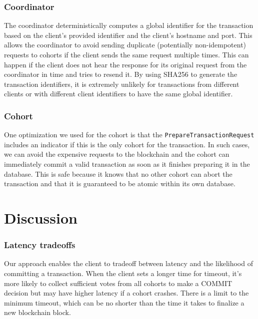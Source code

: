 \documentclass[11pt,conference]{IEEEtran}
\begin{document}
\subsubsection{Coordinator}
The coordinator deterministically computes a global identifier for the transaction based on the client’s provided identifier and the client’s hostname and port. This allows the coordinator to avoid sending duplicate (potentially non-idempotent) requests to cohorts if the client sends the same request multiple times. This can happen if the client does not hear the response for its original request from the coordinator in time and tries to resend it. By using SHA256 to generate the transaction identifiers, it is extremely unlikely for transactions from different clients or with different client identifiers to have the same global identifier.

\subsubsection{Cohort}
One optimization we used for the cohort is that the \texttt{PrepareTransactionRequest} includes an indicator if this is the only cohort for the transaction. In such cases, we can avoid the expensive requests to the blockchain and the cohort can immediately commit a valid transaction as soon as it finishes preparing it in the database. This is safe because it knows that no other cohort can abort the transaction and that it is guaranteed to be atomic within its own database.


\section{Discussion}

\subsubsection{Latency tradeoffs}
Our approach enables the client to tradeoff between latency and the likelihood of committing a transaction. When the client sets a longer time for timeout, it’s more likely to collect sufficient votes from all cohorts to make a COMMIT decision but may have higher latency if a cohort crashes. There is a limit to the minimum timeout, which can be no shorter than the time it takes to finalize a new blockchain block.
\end{document}
